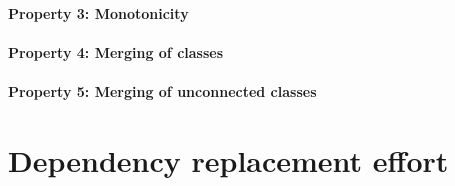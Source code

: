 \paragraph{Property 3: Monotonicity}

\paragraph{Property 4: Merging of classes}

\paragraph{Property 5: Merging of unconnected classes}

\section{Dependency replacement effort}
